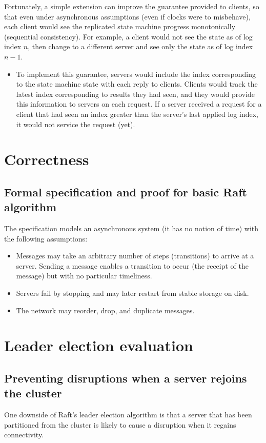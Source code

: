 \documentclass[11pt]{article}
\begin{document}
Fortunately, a simple extension can improve the guarantee provided to clients, so that even under
asynchronous assumptions (even if clocks were to misbehave), each client would see the replicated
state machine progress monotonically (sequential consistency). For example, a client would not
see the state as of log index \(n\), then change to a different server and see only the state as of log
index \(n-1\).
\begin{itemize}
\item To implement this guarantee, servers would include the index corresponding to the state machine
state with each reply to clients. Clients would track the latest index corresponding to results they
had seen, and they would provide this information to servers on each request. If a server received a
request for a client that had seen an index greater than the server’s last applied log index, it
would not service the request (yet).
\end{itemize}
\section{Correctness}
\label{sec:org9d58e0b}
\subsection{Formal specification and proof for basic Raft algorithm}
\label{sec:org4e12c2e}
The specification models an asynchronous system (it has no notion of time) with the following assumptions:
\begin{itemize}
\item Messages may take an arbitrary number of steps (transitions) to arrive at a server. Sending a
message enables a transition to occur (the receipt of the message) but with no particular timeliness.
\item Servers fail by stopping and may later restart from stable storage on disk.
\item The network may reorder, drop, and duplicate messages.
\end{itemize}
\section{Leader election evaluation}
\label{sec:orgdb9fa7e}
\subsection{Preventing disruptions when a server rejoins the cluster}
\label{sec:orged9cfdc}
One downside of Raft’s leader election algorithm is that a server that has been partitioned from the
cluster is likely to cause a disruption when it regains connectivity.
\end{document}
